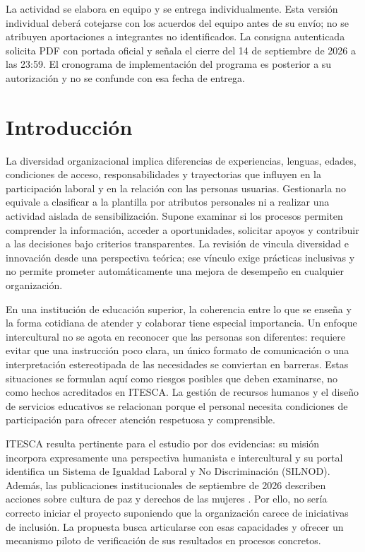 \documentclass[12pt,letterpaper,oneside]{article}
\begin{document}
La actividad se elabora en equipo y se entrega individualmente. Esta versión individual deberá cotejarse con los acuerdos del equipo antes de su envío; no se atribuyen aportaciones a integrantes no identificados. La consigna autenticada solicita PDF con portada oficial y señala el cierre del 14 de septiembre de 2026 a las 23:59. El cronograma de implementación del programa es posterior a su autorización y no se confunde con esa fecha de entrega.

\tableofcontents
\clearpage
{}

\section{Introducción}
La diversidad organizacional implica diferencias de experiencias, lenguas, edades, condiciones de acceso, responsabilidades y trayectorias que influyen en la participación laboral y en la relación con las personas usuarias. Gestionarla no equivale a clasificar a la plantilla por atributos personales ni a realizar una actividad aislada de sensibilización. Supone examinar si los procesos permiten comprender la información, acceder a oportunidades, solicitar apoyos y contribuir a las decisiones bajo criterios transparentes. La revisión de \textcite{fga10sanchez} vincula diversidad e innovación desde una perspectiva teórica; ese vínculo exige prácticas inclusivas y no permite prometer automáticamente una mejora de desempeño en cualquier organización.

En una institución de educación superior, la coherencia entre lo que se enseña y la forma cotidiana de atender y colaborar tiene especial importancia. Un enfoque intercultural no se agota en reconocer que las personas son diferentes: requiere evitar que una instrucción poco clara, un único formato de comunicación o una interpretación estereotipada de las necesidades se conviertan en barreras. Estas situaciones se formulan aquí como riesgos posibles que deben examinarse, no como hechos acreditados en ITESCA. La gestión de recursos humanos y el diseño de servicios educativos se relacionan porque el personal necesita condiciones de participación para ofrecer atención respetuosa y comprensible.

ITESCA resulta pertinente para el estudio por dos evidencias: su misión incorpora expresamente una perspectiva humanista e intercultural y su portal identifica un Sistema de Igualdad Laboral y No Discriminación (SILNOD). Además, las publicaciones institucionales de septiembre de 2026 describen acciones sobre cultura de paz y derechos de las mujeres \parencite{fga10filosofia,fga10igualdad,fga10paz,fga10derechos}. Por ello, no sería correcto iniciar el proyecto suponiendo que la organización carece de iniciativas de inclusión. La propuesta busca articularse con esas capacidades y ofrecer un mecanismo piloto de verificación de sus resultados en procesos concretos.
\end{document}
